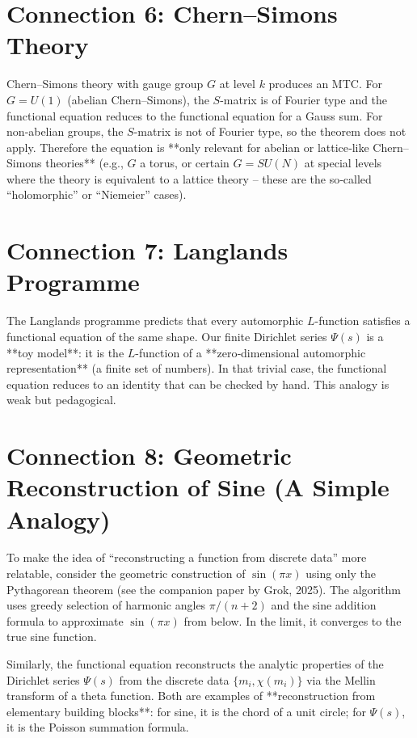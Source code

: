 \documentclass[12pt,a4paper]{article}
\theoremstyle{remark}
\begin{document}
\section{Connection 6: Chern–Simons Theory}

Chern–Simons theory with gauge group $G$ at level $k$ produces an MTC. For $G=U(1)$ (abelian Chern–Simons), the $S$-matrix is of Fourier type and the functional equation reduces to the functional equation for a Gauss sum. For non‑abelian groups, the $S$-matrix is not of Fourier type, so the theorem does not apply. Therefore the equation is **only relevant for abelian or lattice‑like Chern–Simons theories** (e.g., $G$ a torus, or certain $G=SU(N)$ at special levels where the theory is equivalent to a lattice theory – these are the so‑called “holomorphic” or “Niemeier” cases).

\section{Connection 7: Langlands Programme}

The Langlands programme predicts that every automorphic $L$-function satisfies a functional equation of the same shape. Our finite Dirichlet series $\Psi(s)$ is a **toy model**: it is the $L$-function of a **zero‑dimensional automorphic representation** (a finite set of numbers). In that trivial case, the functional equation reduces to an identity that can be checked by hand. This analogy is weak but pedagogical.

\section{Connection 8: Geometric Reconstruction of Sine (A Simple Analogy)}

To make the idea of “reconstructing a function from discrete data” more relatable, consider the geometric construction of $\sin(\pi x)$ using only the Pythagorean theorem (see the companion paper by Grok, 2025). The algorithm uses greedy selection of harmonic angles $\pi/(n+2)$ and the sine addition formula to approximate $\sin(\pi x)$ from below. In the limit, it converges to the true sine function. 

Similarly, the functional equation reconstructs the analytic properties of the Dirichlet series $\Psi(s)$ from the discrete data $\{m_i,\chi(m_i)\}$ via the Mellin transform of a theta function. Both are examples of **reconstruction from elementary building blocks**: for sine, it is the chord of a unit circle; for $\Psi(s)$, it is the Poisson summation formula.
\end{document}
